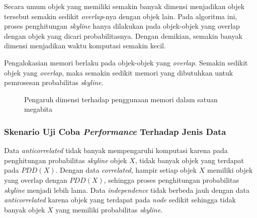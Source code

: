 \tab Secara umum objek yang memiliki semakin banyak dimensi menjadikan objek tersebut semakin sedikit \textit{overlap}-nya dengan objek lain. Pada algoritma ini, proses penghitungan \textit{skyline} hanya dilakukan pada objek-objek yang overlap dengan objek yang dicari probabilitasnya. Dengan demikian, semakin banyak dimensi menjadikan waktu komputasi semakin kecil.

\tab Pengalokasian memori berlaku pada objek-objek yang \textit{overlap}. Semakin sedikit objek yang \textit{overlap}, maka semakin sedikit memori yang dibutuhkan untuk pemrosesan probabilitas \textit{skyline}.

\begin{figure}[H]
	\caption{Pengaruh dimensi terhadap penggunaan memori dalam satuan megabita}\label{fig:uji-dim-mem}
\end{figure}

\subsubsection{Skenario Uji Coba \textit{Performance} Terhadap Jenis Data}
\tab Data \textit{anticorrelated} tidak banyak mempengaruhi komputasi karena pada penghitungan probabilitas \textit{skyline} objek $ X $, tidak banyak objek yang terdapat pada $ PDD(X) $. Dengan data \textit{correlated}, hampir setiap objek $ X $ memiliki objek yang overlap dengan $ PDD(X) $, sehingga proses penghitungan probabilitas \textit{skyline} menjadi lebih lama. Data \textit{independence} tidak berbeda jauh dengan data \textit{anticorrelated} karena objek yang terdapat pada \textit{node} sedikit sehingga tidak banyak objek $ X $ yang memiliki probabilitas \textit{skyline}.

